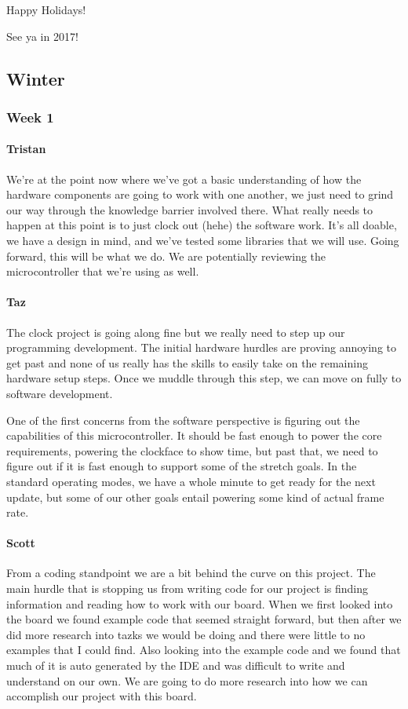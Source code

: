\documentclass[onecolumn, draftclsnofoot,10pt, compsoc]{IEEEtran}
\begin{document}
Happy Holidays!

See ya in 2017!
\subsection{Winter}
\subsubsection{Week 1}
\paragraph{Tristan}
We're at the point now where we've got a basic understanding of how the hardware components are going to work with one another, we just need to grind our way through the knowledge barrier involved there. What really needs to happen at this point is to just clock out (hehe) the software work. It's all doable, we have a design in mind, and we've tested some libraries that we will use. Going forward, this will be what we do. We are potentially reviewing the microcontroller that we're using as well.

\paragraph{Taz}
The clock project is going along fine but we really need to step up our programming development. The initial hardware hurdles are proving annoying to get past and none of us really has the skills to easily take on the remaining hardware setup steps. Once we muddle through this step, we can move on fully to software development.

One of the first concerns from the software perspective is figuring out the capabilities of this microcontroller. It should be fast enough to power the core requirements, powering the clockface to show time, but past that, we need to figure out if it is fast enough to support some of the stretch goals. In the standard operating modes, we have a whole minute to get ready for the next update, but some of our other goals entail powering some kind of actual frame rate.
\paragraph{Scott}
From a coding standpoint we are a bit behind the curve on this project. The main hurdle that is stopping us from writing code for our project is finding information and reading how to work with our board. When we first looked into the board we found example code that seemed straight forward, but then after we did more research into tazks we would be doing and there were little to no examples that I could find. Also looking into the example code and we found that much of it is auto generated by the IDE and was difficult to write and understand on our own. We are going to do more research into how we can accomplish our project with this board.
\end{document}

